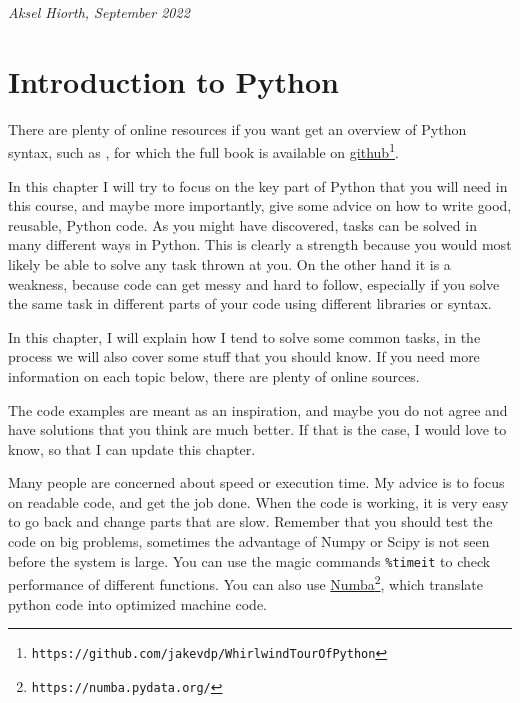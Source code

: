 \documentclass[graybox,sectrefs,envcountresetchap,open=right,final]{svmonodo}
\newenvironment{graybox2admon}[1][]{
\begin{graybox2mdframed}[frametitle=#1]
}
{
\end{graybox2mdframed}
}
\begin{document}
\noindent
\noindent

\hfill{\it Aksel Hiorth, September 2022  }

\tableofcontents

\vspace{1cm} %

\mainmatter

\chapter{Introduction to Python}
\label{ch:pyt}

There are plenty of online resources if you want get an overview of Python syntax, such as \cite{vanderplas2016whirlwind}, for which the full book is available on \href{{https://github.com/jakevdp/WhirlwindTourOfPython}}{github}\footnote{\texttt{https://github.com/jakevdp/WhirlwindTourOfPython}}.

In this chapter I will try to focus on the key part of Python that you will need in this course, and maybe more importantly, give some advice on how to write good, reusable, Python code. As you might have discovered, tasks can be solved in many different ways in Python. This is clearly a strength because you would most likely be able to solve any task thrown at you. On the other hand it is a weakness, because code can get messy and hard to follow, especially if you solve the same task in different parts of your code using different libraries or syntax.

In this chapter, I will explain how I tend to solve some common tasks, in the process we will also cover some stuff that you should know. If you need more information on each topic below, there are plenty of online sources. 

The code examples are meant as an inspiration, and maybe you do not agree and have solutions that you think are much better. If that is the case, I would love to know, so that I can update this chapter.



\begin{graybox2admon}[Speed and readability]
Many people are concerned about speed or execution time. My advice is to focus on readable code, and get the job done. When the code is working, it is very easy to go back and change parts that are slow. Remember that you should test the code on big problems, sometimes the advantage of Numpy or Scipy is not seen before the system is large. You can use the magic commands \Verb!%
\end{graybox2admon}
\end{document}

